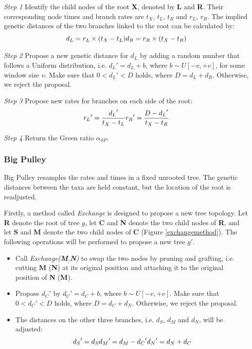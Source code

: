 \documentclass{bmcart}
\begin{document}
\emph{Step 1} Identify the child nodes of the root \textbf{X}, denoted by \textbf{L} and \textbf{R}. Their corresponding node times and branch rates are $t_X$, $t_L$, $t_R$ and $r_L$, $r_R$. The implied genetic distances of the two branches linked to the root can be calculated by:
\begin{equation}
\label{sma1_dis}
{d_L} = {r_L} \times ({{t_X} - {t_L}})\\
{d_R} = {r_R} \times ({{t_X} - {t_R}})
 \end{equation}

\emph{Step 2} Propose a new genetic distance for $d_L$ by adding a random number that follows a Uniform distribution, i.e.  ${d_L}' = {d_L} + b$, where $b \sim U[ - v, + v]$, for some window size $v$. Make sure that $0 < {d_L}' < D$ holds, where $D = {d_L} + {d_R}$. Otherwise, we reject the proposal.

\emph{Step 3} Propose new rates for branches on each side of the root:
\begin{equation}
\label{sma1_rate}
{r_L}' = \frac{{{d_L}'}}{{{t_X} - {t_L}}}\\
{r_R}' = \frac{{D - {d_L}'}}{{{t_X} - {t_R}}}
 \end{equation}

\emph{Step 4} Return the Green ratio ${\alpha_{SP}}$.
\subsubsection*{Big Pulley}
Big Pulley resamples the rates and times in a fixed unrooted tree. The genetic distances between the taxa are held constant, but the location of the root is readjusted.

Firstly, a method called \textit{Exchange} is designed to propose a new tree topology. Let \textbf{R} denote the root of tree $g$, let \textbf{C} and \textbf{N} denote the two child nodes of \textbf{R}, and let \textbf{S} and \textbf{M} denote the two child nodes of \textbf{C} (Figure \ref{exchangemethod}). The following operations will be performed to propose a new tree $g'$.
\begin{itemize}
\item Call \textit{Exchange(\textbf{M},\textbf{N})} to swap the two nodes by pruning and grafting, i.e. cutting \textbf{M} (\textbf{N}) at its original position and attaching it to the original position of \textbf{N} (\textbf{M}).
\item Propose ${d_C}'$ by ${d_C}' = {d_C} + b$, where $b \sim U[ - v, + v]$. Make sure that $0 < {d_C}' < D$ holds, where $D = {d_C} + {d_{N}}$. Otherwise, we reject the proposal.
\item The distances on the other three branches, i.e. $d_S$, $d_{M}$ and $d_{N}$, will be adjusted:
\begin{equation}\label{big_dis}
{d_S}' = {d_S}\\
{d_{M}}' = {d_{M}} - {d_C}'\\
{d_{N}}' = {d_{N}} + {d_C}
\end{equation}
\end{itemize}
\end{document}
